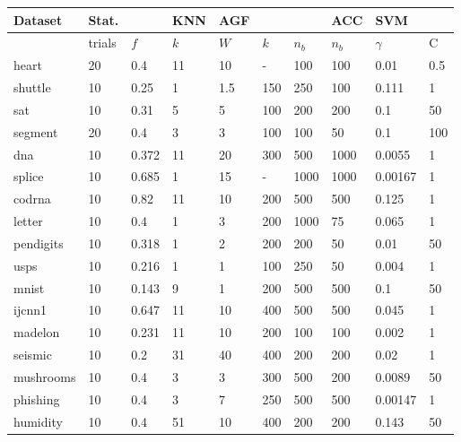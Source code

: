 
\begin{tabular}{|l||ll|l|lll|l|ll|}
	\hline
Dataset	& Stat. & & KNN & AGF & & & ACC & SVM & \\\hline
 & trials & $f$ & $k$ & $W$ & $k$ & $n_b$ & $n_b$ & $\gamma$ & C\\\hline\hline
	heart & 20 & 0.4 & 11 & 10 & - & 100 & 100 & 0.01 & 0.5 \\
	shuttle & 10 & 0.25 & 1 & 1.5 & 150 & 250 & 100 & 0.111 & 1 \\
	sat & 10 & 0.31 & 5 & 5 & 100 & 200 & 200 & 0.1 & 50\\
	segment & 20 & 0.4 & 3 & 3 & 100 & 100 & 50 & 0.1 & 100 \\
	dna & 10 & 0.372 & 11 & 20 & 300 & 500 & 1000 & 0.0055 & 1 \\
	splice & 10 & 0.685 & 1 & 15 & - & 1000 & 1000 & 0.00167 & 1 \\
	codrna & 10 & 0.82 & 11 & 10 & 200 & 500 & 500 & 0.125 & 1 \\
	letter & 10 & 0.4 & 1 & 3 & 200 & 1000 & 75 & 0.065 & 1 \\
	pendigits & 10 & 0.318 & 1 & 2 & 200 & 200 & 50 & 0.01 & 50 \\
	usps & 10 & 0.216 & 1 & 1 & 100 & 250 & 50 & 0.004 & 1 \\
	mnist & 10 & 0.143 & 9 & 1 & 200 & 500 & 500 & 0.1 & 50 \\
	ijcnn1 & 10 & 0.647 & 11 & 10 & 400 & 500 & 500 & 0.045 & 1 \\
	madelon & 10 & 0.231 & 11 & 10 & 200 & 100 & 100 & 0.002 & 1 \\
	seismic & 10 & 0.2 & 31 & 40 & 400 & 200 & 200 & 0.02 & 1 \\
	mushrooms & 10 & 0.4 & 3 & 3 & 300 & 500 & 200 & 0.0089 & 50 \\
	phishing & 10 & 0.4 & 3 & 7 & 250 & 500 & 500 & 0.00147 & 1 \\
	humidity & 10 & 0.4 & 51 & 10 & 400 & 200 & 200 & 0.143 & 50 \\
	\hline
\end{tabular}

